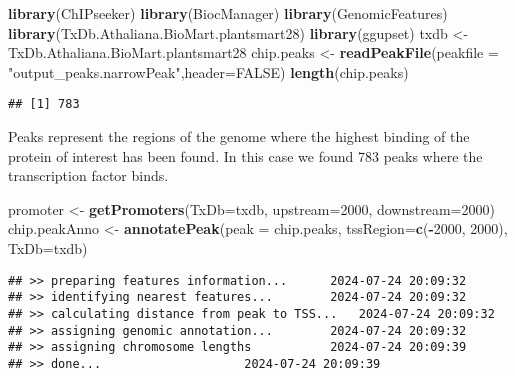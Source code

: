 \documentclass[
]{article}
\newenvironment{Shaded}{\begin{snugshade}}{\end{snugshade}}
\newcommand{\AttributeTok}[1]{\textcolor[rgb]{0.13,0.29,0.53}{#1}}
\newcommand{\ConstantTok}[1]{\textcolor[rgb]{0.56,0.35,0.01}{#1}}
\newcommand{\DecValTok}[1]{\textcolor[rgb]{0.00,0.00,0.81}{#1}}
\newcommand{\FunctionTok}[1]{\textcolor[rgb]{0.13,0.29,0.53}{\textbf{#1}}}
\newcommand{\NormalTok}[1]{#1}
\newcommand{\OtherTok}[1]{\textcolor[rgb]{0.56,0.35,0.01}{#1}}
\newcommand{\SpecialCharTok}[1]{\textcolor[rgb]{0.81,0.36,0.00}{\textbf{#1}}}
\newcommand{\StringTok}[1]{\textcolor[rgb]{0.31,0.60,0.02}{#1}}
\begin{document}
\begin{Shaded}
\begin{Highlighting}[]
\FunctionTok{library}\NormalTok{(ChIPseeker)}
\FunctionTok{library}\NormalTok{(BiocManager)}
\FunctionTok{library}\NormalTok{(GenomicFeatures)}
\FunctionTok{library}\NormalTok{(TxDb.Athaliana.BioMart.plantsmart28)}
\FunctionTok{library}\NormalTok{(ggupset)}
\NormalTok{txdb }\OtherTok{\textless{}{-}}\NormalTok{ TxDb.Athaliana.BioMart.plantsmart28}
\NormalTok{chip.peaks }\OtherTok{\textless{}{-}} \FunctionTok{readPeakFile}\NormalTok{(}\AttributeTok{peakfile =} \StringTok{"output\_peaks.narrowPeak"}\NormalTok{,}\AttributeTok{header=}\ConstantTok{FALSE}\NormalTok{)}
\FunctionTok{length}\NormalTok{(chip.peaks)}
\end{Highlighting}
\end{Shaded}

\begin{verbatim}
## [1] 783
\end{verbatim}

Peaks represent the regions of the genome where the highest binding of
the protein of interest has been found. In this case we found 783 peaks
where the transcription factor binds.

\begin{Shaded}
\begin{Highlighting}[]
\NormalTok{promoter }\OtherTok{\textless{}{-}} \FunctionTok{getPromoters}\NormalTok{(}\AttributeTok{TxDb=}\NormalTok{txdb, }
                         \AttributeTok{upstream=}\DecValTok{2000}\NormalTok{, }
                         \AttributeTok{downstream=}\DecValTok{2000}\NormalTok{)}
\NormalTok{chip.peakAnno }\OtherTok{\textless{}{-}} \FunctionTok{annotatePeak}\NormalTok{(}\AttributeTok{peak =}\NormalTok{ chip.peaks, }
                             \AttributeTok{tssRegion=}\FunctionTok{c}\NormalTok{(}\SpecialCharTok{{-}}\DecValTok{2000}\NormalTok{, }\DecValTok{2000}\NormalTok{),}
                             \AttributeTok{TxDb=}\NormalTok{txdb)}
\end{Highlighting}
\end{Shaded}

\begin{verbatim}
## >> preparing features information...      2024-07-24 20:09:32 
## >> identifying nearest features...        2024-07-24 20:09:32 
## >> calculating distance from peak to TSS...   2024-07-24 20:09:32 
## >> assigning genomic annotation...        2024-07-24 20:09:32 
## >> assigning chromosome lengths           2024-07-24 20:09:39 
## >> done...                    2024-07-24 20:09:39
\end{verbatim}
\end{document}
